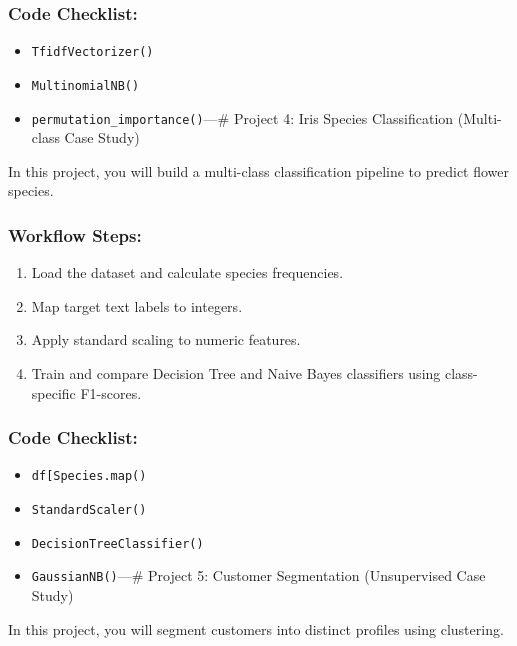 \subsubsection{Code Checklist:}\label{code-checklist-2}

\begin{itemize}
\tightlist
\item
  \texttt{TfidfVectorizer()}
\item
  \texttt{MultinomialNB()}
\item
  \texttt{permutation\_importance()}\n\n---\n\n\# Project 4: Iris
  Species Classification (Multi-class Case Study)
\end{itemize}

In this project, you will build a multi-class classification pipeline to
predict flower species.

\subsubsection{Workflow Steps:}\label{workflow-steps-3}

\begin{enumerate}
\def\labelenumi{\arabic{enumi}.}
\tightlist
\item
  Load the dataset and calculate species frequencies.
\item
  Map target text labels to integers.
\item
  Apply standard scaling to numeric features.
\item
  Train and compare Decision Tree and Naive Bayes classifiers using
  class-specific F1-scores.
\end{enumerate}

\subsubsection{Code Checklist:}\label{code-checklist-3}

\begin{itemize}
\tightlist
\item
  \texttt{df{[}\textquotesingle{}Species\textquotesingle{}{]}.map()}
\item
  \texttt{StandardScaler()}
\item
  \texttt{DecisionTreeClassifier()}
\item
  \texttt{GaussianNB()}\n\n---\n\n\# Project 5: Customer Segmentation
  (Unsupervised Case Study)
\end{itemize}

In this project, you will segment customers into distinct profiles using
clustering.

